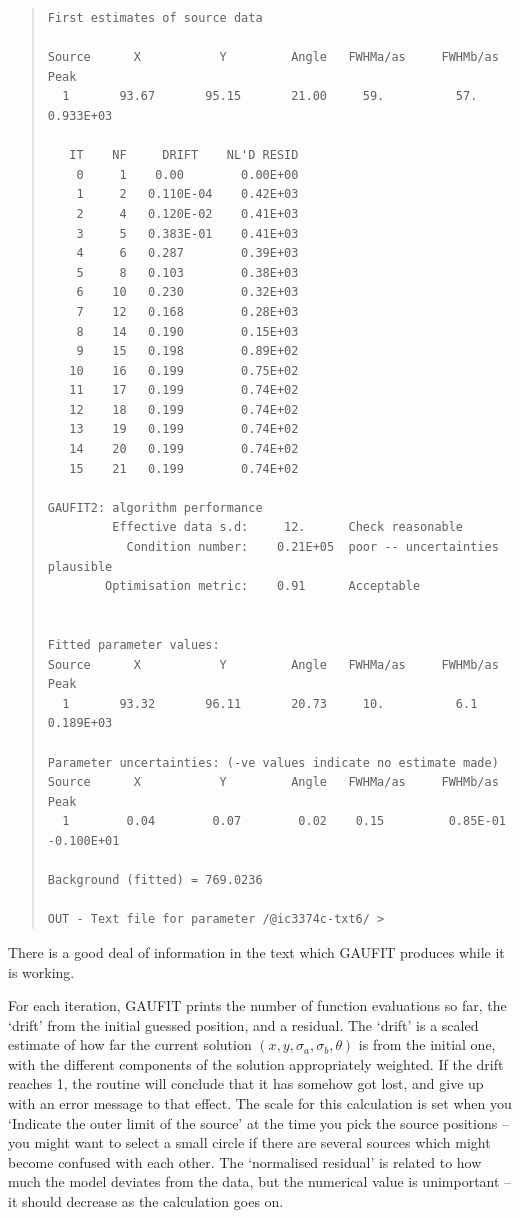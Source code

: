\documentclass[twoside,11pt]{article}
\newenvironment{myquote}{\begin{quote}\begin{small}}{\end{small}\end{quote}}
\begin{document}
\begin{myquote}
\begin{verbatim}
First estimates of source data

Source      X           Y         Angle   FWHMa/as     FWHMb/as         Peak
  1       93.67       95.15       21.00     59.          57.        0.933E+03

   IT    NF     DRIFT    NL'D RESID
    0     1    0.00        0.00E+00
    1     2   0.110E-04    0.42E+03
    2     4   0.120E-02    0.41E+03
    3     5   0.383E-01    0.41E+03
    4     6   0.287        0.39E+03
    5     8   0.103        0.38E+03
    6    10   0.230        0.32E+03
    7    12   0.168        0.28E+03
    8    14   0.190        0.15E+03
    9    15   0.198        0.89E+02
   10    16   0.199        0.75E+02
   11    17   0.199        0.74E+02
   12    18   0.199        0.74E+02
   13    19   0.199        0.74E+02
   14    20   0.199        0.74E+02
   15    21   0.199        0.74E+02

GAUFIT2: algorithm performance
         Effective data s.d:     12.      Check reasonable
           Condition number:    0.21E+05  poor -- uncertainties plausible
        Optimisation metric:    0.91      Acceptable


Fitted parameter values:
Source      X           Y         Angle   FWHMa/as     FWHMb/as         Peak
  1       93.32       96.11       20.73     10.          6.1        0.189E+03

Parameter uncertainties: (-ve values indicate no estimate made)
Source      X           Y         Angle   FWHMa/as     FWHMb/as         Peak
  1        0.04        0.07        0.02    0.15         0.85E-01   -0.100E+01

Background (fitted) = 769.0236

OUT - Text file for parameter /@ic3374c-txt6/ >
\end{verbatim}
\end{myquote}

There is a good deal of information in the text which GAUFIT produces
while it is working.

For each iteration, GAUFIT prints the number of function evaluations
so far, the `drift' from the initial guessed position, and a
residual.  The `drift' is a scaled estimate of how far the current
solution $(x,y,\sigma_a,\sigma_b,\theta)$ is from the initial one,
with the different components of the solution appropriately weighted.
If the drift reaches 1, the routine will conclude that it has somehow
got lost, and give up with an error message to that effect. The scale
for this calculation is set when you `Indicate the outer limit of the
source' at the time you pick the source positions -- you might want to
select a small circle if there are several sources which might become
confused with each other.  The `normalised residual' is related to how
much the model deviates from the data, but the numerical value is
unimportant -- it should decrease as the calculation goes on.
\end{document}
